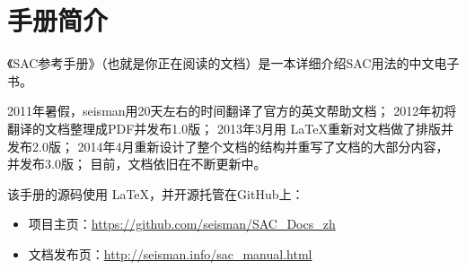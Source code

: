 \section{手册简介}
《SAC参考手册》（也就是你正在阅读的文档）是一本详细介绍SAC用法的中文电子书。

2011年暑假，seisman用20天左右的时间翻译了官方的英文帮助文档；
2012年初将翻译的文档整理成PDF并发布1.0版；
2013年3月用 \LaTeX 重新对文档做了排版并发布2.0版；
2014年4月重新设计了整个文档的结构并重写了文档的大部分内容，并发布3.0版；
目前，文档依旧在不断更新中。

该手册的源码使用 \LaTeX ，并开源托管在GitHub上：
\begin{itemize}
\item 项目主页：\url{https://github.com/seisman/SAC_Docs_zh}
\item 文档发布页：\url{http://seisman.info/sac_manual.html}
\end{itemize}

